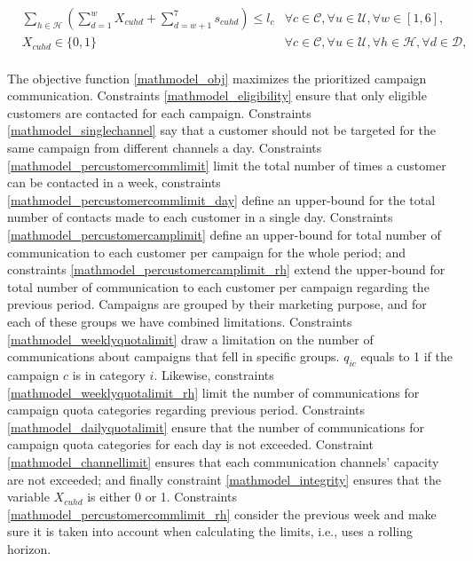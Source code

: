 \documentclass[11pt]{article}
\begin{document}
\begin{align}
&\sum\limits_{h\in\mathcal{H}}\left( \sum_{d=1}^{w}X_{{c}{u}{h}{d}} + \sum_{d=w+1}^{7}s_{{c}{u}{h}{d}}\right) \leq l_{c} &\forall c \in \mathcal{C}, \forall u \in \mathcal{U}, \forall w \in [1,6], \label{mathmodel_percustomercamplimit_rh}&\\
&X_{{c}{u}{h}{d}} \in \{0,1\}&\forall c \in \mathcal{C}, \forall u \in \mathcal{U}, \forall h \in \mathcal{H}, \forall d \in \mathcal{D}, \label{mathmodel_integrity}
\end{align}\\

The objective function \eqref{mathmodel_obj} maximizes the prioritized campaign communication. Constraints \eqref{mathmodel_eligibility} ensure that only eligible customers are contacted for each campaign. Constraints \eqref{mathmodel_singlechannel} say that a customer should not be targeted for the same campaign from different channels a day. Constraints \eqref{mathmodel_percustomercommlimit} limit the total number of times a customer can be contacted in a week, constraints \eqref{mathmodel_percustomercommlimit_day} define an upper-bound for the total number of contacts made to each customer in a single day. Constraints \eqref{mathmodel_percustomercamplimit} define an upper-bound for total number of communication to each customer per campaign for the whole period; and constraints \eqref{mathmodel_percustomercamplimit_rh} extend the upper-bound for total number of communication to each customer per campaign regarding the previous period. Campaigns are grouped by their marketing purpose, and for each of these groups we have combined limitations. Constraints \eqref{mathmodel_weeklyquotalimit} draw a limitation on the number of communications about campaigns that fell in specific groups. $q_{{i}{c}}$ equals to 1 if the campaign $c$ is in category  $i$. Likewise, constraints \eqref{mathmodel_weeklyquotalimit_rh} limit the number of communications for campaign quota categories regarding previous period. Constraints \eqref{mathmodel_dailyquotalimit} ensure that the number of communications for campaign quota categories for each day is not exceeded. Constraint \eqref{mathmodel_channellimit} ensures that each communication channels' capacity are not exceeded; and finally constraint \eqref{mathmodel_integrity} ensures that the variable $X_{{c}{u}{h}{d}}$ is either 0 or 1.
Constraints \eqref{mathmodel_percustomercommlimit_rh} consider the previous week and make sure it is taken into account when calculating the limits, i.e., uses a rolling horizon.\\
\end{document}
